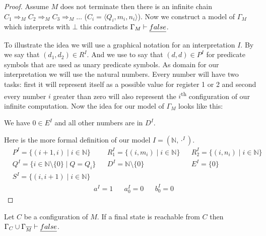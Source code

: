 \begin{proof}
	Assume $M$ does not terminate then there is an infinite chain $C_1\Rightarrow_M C_2\Rightarrow_M C_3\Rightarrow_M\dots$ ($C_i=\langle Q_i,m_i,n_i\rangle$). Now we construct a model of $\Gamma_M$ which interprets \false{} with $\bot$ this contradicts $\Gamma_M\vdash\emph{false}$.
	
	To illustrate the idea we will use a graphical notation for an interpretation $I$.
	By
	we say that $(d_1,d_2)\in R^I$. And we use
	to say that $(d,d)\in P^I$ for predicate symbols that are used as unary predicate symbols. 
	As domain for our interpretation we will use the natural numbers. Every number will have two tasks: first it will represent itself as a possible value for register 1 or 2 and second every number $i$ greater than zero will also represent the $i$\textsuperscript{th} configuration of our infinite computation.
	Now the idea for our model of $\Gamma_M$ looks like this:
	
	\begin{figure}[H]
		
	\end{figure}
	We have $0\in E^I$ and all other numbers are in $D^I$.
	
	Here is the more formal definition of our model $I=(\mathbb{N},\cdot^I)$.
	\begin{align*}%
		  & P^I=\{(i+1,i)\mid i\in\mathbb{N}\}              &   & R_1^I=\{(i,m_i)\mid i\in\mathbb{N}\} &   & R_2^I=\{(i,n_i)\mid i\in\mathbb{N}\} \\
		  & Q^I=\{ i\in\mathbb{N}\setminus\{0\}\mid Q=Q_i\} &   & D^I=\mathbb{N}\setminus\{0\}         &   & E^I=\{0\}                            \\
		& S^I=\{(i,i+1)\mid i\in\mathbb{N}\}
	\end{align*}
	\begin{align*}
		  & a^I=1 &   & a_0^I=0 &   & b_0^I=0 
	\end{align*}
\end{proof}
\begin{claim}\label{cla.18}
	Let $C$ be a configuration of $M$. If a final state is reachable from $C$ then $\Gamma_C\cup\Gamma_{\overline{M}}\vdash\emph{false}$.
\end{claim}
